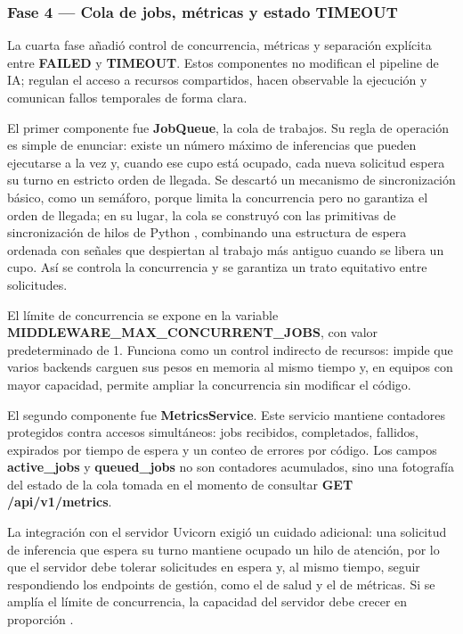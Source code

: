 \subsubsection{Fase 4 — Cola de jobs, métricas y estado TIMEOUT}

La cuarta fase añadió control de concurrencia, métricas y separación explícita entre \textbf{FAILED} y \textbf{TIMEOUT}. Estos componentes no modifican el pipeline de IA; regulan el acceso a recursos compartidos, hacen observable la ejecución y comunican fallos temporales de forma clara.

El primer componente fue \textbf{JobQueue}, la cola de trabajos. Su regla de operación es simple de enunciar: existe un número máximo de inferencias que pueden ejecutarse a la vez y, cuando ese cupo está ocupado, cada nueva solicitud espera su turno en estricto orden de llegada. Se descartó un mecanismo de sincronización básico, como un semáforo, porque limita la concurrencia pero no garantiza el orden de llegada; en su lugar, la cola se construyó con las primitivas de sincronización de hilos de Python \cite{python_threading}, combinando una estructura de espera ordenada con señales que despiertan al trabajo más antiguo cuando se libera un cupo. Así se controla la concurrencia y se garantiza un trato equitativo entre solicitudes.

El límite de concurrencia se expone en la variable \textbf{MIDDLEWARE\_MAX\_CONCURRENT\_JOBS}, con valor predeterminado de 1. Funciona como un control indirecto de recursos: impide que varios backends carguen sus pesos en memoria al mismo tiempo y, en equipos con mayor capacidad, permite ampliar la concurrencia sin modificar el código.

El segundo componente fue \textbf{MetricsService}. Este servicio mantiene contadores protegidos contra accesos simultáneos: jobs recibidos, completados, fallidos, expirados por tiempo de espera y un conteo de errores por código. Los campos \textbf{active\_jobs} y \textbf{queued\_jobs} no son contadores acumulados, sino una fotografía del estado de la cola tomada en el momento de consultar \textbf{GET /api/v1/metrics}.

La integración con el servidor Uvicorn exigió un cuidado adicional: una solicitud de inferencia que espera su turno mantiene ocupado un hilo de atención, por lo que el servidor debe tolerar solicitudes en espera y, al mismo tiempo, seguir respondiendo los endpoints de gestión, como el de salud y el de métricas. Si se amplía el límite de concurrencia, la capacidad del servidor debe crecer en proporción \cite{uvicorn_docs}.

